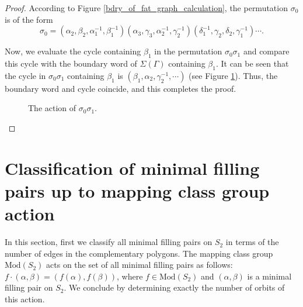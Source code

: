 \documentclass[11pt,reqno]{amsart}
\theoremstyle{plain}
\theoremstyle{definition}
\theoremstyle{remark}
\numberwithin{equation}{section}
\numberwithin{figure}{section}
\begin{document}
\begin{proof}
    According to Figure \ref{bdry_of_fat_graph_calculation}, the permutation $\sigma_0$ is of the form 
    $$\sigma_0= (\alpha_2, \beta_2, \alpha_1^{-1}, \beta_1^{-1}) (\alpha_3, \gamma_3, \alpha_2^{-1}, \gamma_2^{-1}) (\delta_1^{-1}, \gamma_2, \delta_2, \gamma_1^{-1}) \cdots.$$
    
    Now, we evaluate the cycle containing $\beta_1$ in the permutation $\sigma_0\sigma_1$ and compare this cycle with the boundary word of $\Sigma(\Gamma)$ containing $\beta_1$. It can be seen that the cycle in $\sigma_0\sigma_1$ containing $\beta_1$ is $(\beta_1, \alpha_2, \gamma_2^{-1}, \cdots)$ (see Figure \ref{action_of_sigma0_inv_sigma_1}). Thus, the boundary word and cycle coincide, and this completes the proof.
    
    \begin{figure}[htbp]
    \begin{center}
    \end{center}
    \caption{The action of $\sigma_0\sigma_1$.}
    \label{action_of_sigma0_inv_sigma_1}
    \end{figure}
\end{proof}

\section{Classification of minimal filling pairs up to mapping class group action}
In this section, first we classify all minimal filling pairs on $S_2$ in terms of the number of edges in the complementary polygons. The mapping class group $\mathrm{Mod}(S_2)$ acts on the set of all minimal filling pairs as follows: $f \cdot (\alpha,\beta)=(f(\alpha), f(\beta))$, where $f \in \mathrm{Mod}(S_2)$ and $(\alpha,\beta)$ is a minimal filling pair on $S_2$. We conclude by determining exactly the number of orbits of this action.
\end{document}
